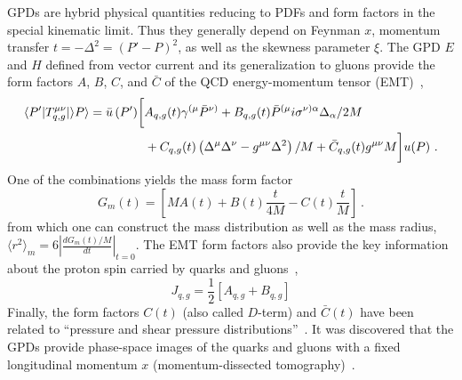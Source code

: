 GPDs are hybrid physical quantities reducing
to PDFs and form factors in the special kinematic limit. Thus they generally depend on Feynman $x$, momentum transfer $t= - \Delta^2= (P'-P)^2$, 
as well as the skewness parameter $\xi$. 
The GPD $E$ and $H$ defined from vector
current and its generalization to gluons 
provide the form factors $A$, $B$, $C$, and $\bar C$ of the QCD energy-momentum tensor (EMT)~\cite{Ji:1996ek}, 
\begin{equation}
\begin{split}
\label{Tmunuformfactors}
\langle{P'}|T_{q, g}^{\mu \nu}|\rangle{P}\rangle=\bar{u}\left(P^{\prime}\right)&\bigg{[}A_{q, g}(t) \gamma^{(\mu} \bar{P}^{\nu)}+B_{q, g}(t) \bar{P}^{(\mu} i \sigma^{\nu) \alpha} \Delta_{\alpha} / 2 M\\
&\;\;+C_{q, g}(t)\left(\Delta^{\mu} \Delta^{\nu}-g^{\mu \nu} \Delta^{2}\right) / M
+\bar{C}_{q, g}(t) g^{\mu \nu} M\bigg{]} u(P)\ .
\end{split}
\end{equation}
One of the combinations yields the mass form factor~\cite{Ji:2021mtz} 
\begin{equation}
    G_m(t)=\left[ MA\left(t\right) +B(t)\frac{t}{4M}
-C(t)\frac{t}{M}\right] \ . 
\end{equation}
from which one can construct the mass distribution
as well as the mass radius, $\langle r^2 \rangle_{m}
     = 6 \left|\frac{dG_{m}(t)/M}{dt}\right|_{t=0}$. 
The EMT form factors also provide the key information about 
the proton spin carried by quarks 
and gluons~\cite{Ji:1996ek}, 
\begin{equation}
     J_{q, g} = \frac{1}{2}[A_{q,g}+B_{q,g}]
\end{equation}
Finally, the form factors $C(t)$ (also called $D$-term) and $\bar C(t)$ have been related to ``pressure and shear pressure distributions''~\cite{Polyakov:2018zvc}. It was discovered that the GPDs provide phase-space images of the quarks and gluons with a fixed longitudinal momentum $x$ (momentum-dissected tomography)~\cite{Burkardt:2000za, Belitsky:2003nz}. 

